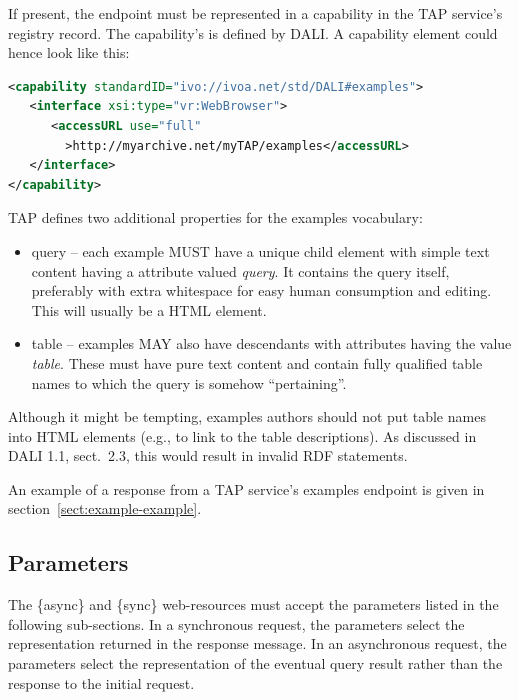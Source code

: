 \documentclass[11pt,letter]{ivoa}
\begin{document}
If present, the endpoint must be represented in a capability in the TAP 
service's registry record. The capability's  is defined by
DALI. A capability element could hence look like this:

\begin{lstlisting}[language=XML,basicstyle=\footnotesize]
<capability standardID="ivo://ivoa.net/std/DALI#examples">
   <interface xsi:type="vr:WebBrowser">
      <accessURL use="full"
        >http://myarchive.net/myTAP/examples</accessURL>
   </interface>
</capability>
\end{lstlisting}

TAP defines two additional properties for the examples vocabulary:

\begin{itemize}
\item query -- each example MUST have a unique child element with simple text 
content having a  attribute valued {\em query}. It contains the query itself, 
preferably with extra whitespace for easy human consumption and editing. This 
will usually be a HTML  element.
    
\item table -- examples MAY also have descendants with  attributes having 
the value {\em table}. These must have pure text content and contain fully qualified 
table names to which the query is somehow ``pertaining''.
\end{itemize}

Although it might be tempting, examples authors should not put table
names into HTML  elements (e.g., to link to the table
descriptions).  As discussed in DALI 1.1, sect.~2.3, this would result
in invalid RDF statements.

An example of a response from a TAP service's examples endpoint is given
in section~\ref{sect:example-example}.

\subsection{Parameters}
\label{sec:parameters}

The \{async\} and \{sync\} web-resources must accept the parameters listed in 
the following sub-sections. In a synchronous request, the parameters select the 
representation returned in the response message. In an asynchronous request, the 
parameters select the representation of the eventual query result rather than 
the response to the initial request.
\end{document}
